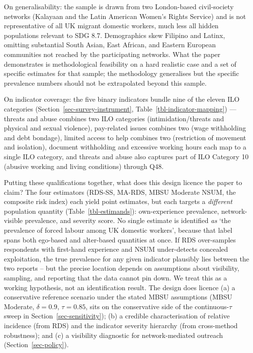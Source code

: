 \documentclass[
  12pt,
  letterpaper,
  DIV=11,
  numbers=noendperiod]{scrartcl}
\begin{document}
On generalisability: the sample is drawn from two London-based
civil-society networks (Kalayaan and the Latin American Women's Rights
Service) and is not representative of all UK migrant domestic workers,
much less all hidden populations relevant to SDG 8.7. Demographics skew
Filipino and Latinx, omitting substantial South Asian, East African, and
Eastern European communities not reached by the participating networks.
What the paper demonstrates is methodological feasibility on a hard
realistic case and a set of specific estimates for that sample; the
methodology generalises but the specific prevalence numbers should not
be extrapolated beyond this sample.

On indicator coverage: the five binary indicators bundle nine of the
eleven ILO categories (Section~\ref{sec-survey-instrument},
Table~\ref{tbl-indicator-mapping}) --- threats and abuse combines two
ILO categories (intimidation/threats and physical and sexual violence),
pay-related issues combines two (wage withholding and debt bondage),
limited access to help combines two (restriction of movement and
isolation), document withholding and excessive working hours each map to
a single ILO category, and threats and abuse also captures part of ILO
Category 10 (abusive working and living conditions) through Q48.

Putting these qualifications together, what does this design licence the
paper to claim? The four estimators (RDS-SS, MA-RDS, MBSU Moderate NSUM,
the composite risk index) each yield point estimates, but each targets a
\emph{different} population quantity (Table~\ref{tbl-estimands}):
own-experience prevalence, network-visible prevalence, and severity
score. No single estimate is identified \emph{as} `the prevalence of
forced labour among UK domestic workers', because that label spans both
ego-based and alter-based quantities at once. If RDS over-samples
respondents with first-hand experience and NSUM under-detects concealed
exploitation, the true prevalence for any given indicator plausibly lies
between the two reports -- but the precise location depends on
assumptions about visibility, sampling, and reporting that the data
cannot pin down. We treat this as a working hypothesis, not an
identification result. The design does licence (a) a conservative
reference scenario under the stated MBSU assumptions (MBSU Moderate,
\(\delta = 0.9\), \(\tau = 0.85\), sits on the conservative side of the
continuous-\(\tau\) sweep in Section~\ref{sec-sensitivity}); (b) a
credible characterisation of relative incidence (from RDS) and the
indicator severity hierarchy (from cross-method robustness); and (c) a
visibility diagnostic for network-mediated outreach
(Section~\ref{sec-policy}).
\end{document}

